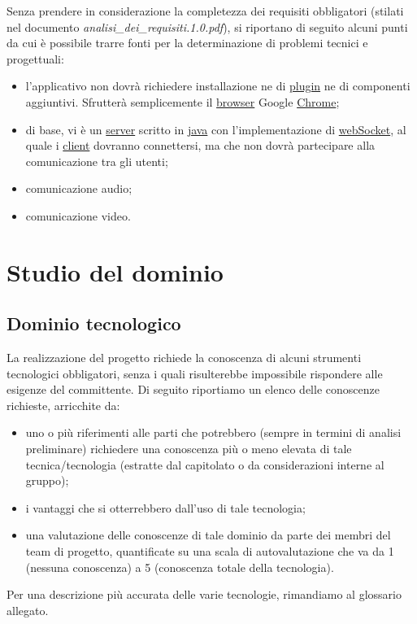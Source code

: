 Senza prendere in considerazione la completezza dei requisiti obbligatori (stilati nel documento \textit{analisi\_dei\_requisiti.1.0.pdf}), si riportano di seguito alcuni punti  da cui è possibile trarre fonti per la determinazione di problemi tecnici e progettuali:

\begin{itemize}
	\item l'applicativo non dovrà richiedere installazione ne di \underline{plugin} ne di componenti aggiuntivi. Sfrutterà semplicemente il \underline{browser} Google \underline{Chrome};
	\item di base, vi è un \underline{server} scritto in \underline{java} con l'implementazione di \underline{webSocket}, al quale i \underline{client} dovranno connettersi, ma che non dovrà partecipare alla comunicazione tra gli utenti;
	\item comunicazione audio;
	\item comunicazione video.
\end{itemize}
\clearpage
\section{Studio del dominio}

\subsection{Dominio tecnologico}
La realizzazione del progetto \caName{} richiede la conoscenza di alcuni strumenti tecnologici obbligatori, senza i quali risulterebbe impossibile rispondere alle esigenze del committente. Di seguito riportiamo un elenco delle conoscenze richieste, arricchite da:

\begin{itemize}
	\item uno o più riferimenti alle parti che potrebbero (sempre in termini di analisi preliminare) richiedere una conoscenza più o meno elevata di tale tecnica/tecnologia (estratte dal capitolato o da considerazioni interne al gruppo);
	\item i vantaggi che si otterrebbero dall'uso di tale tecnologia;
	\item una valutazione delle conoscenze di tale dominio da parte dei membri del team di progetto, quantificate su una scala di autovalutazione che va da 1 (nessuna conoscenza) a 5 (conoscenza totale della tecnologia).
\end{itemize}
Per una descrizione più accurata delle varie tecnologie, rimandiamo al glossario allegato.

